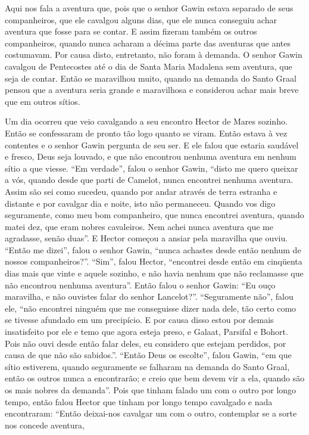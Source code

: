 Aqui nos fala a aventura que,  pois que o senhor Gawin estava separado
de seus companheiros, que ele cavalgou alguns dias, que ele nunca conseguiu
achar aventura que  fosse para se contar. E assim fizeram também os outros
companheiros, quando nunca acharam a décima parte das aventuras que antes
costumavam. Por causa disto, entretanto, não foram à demanda. O senhor Gawin
cavalgou de Pentecostes até o dia de Santa Maria Madalena sem aventura, que
seja de contar. Então se maravilhou muito, quando na demanda do Santo Graal
pensou que a aventura seria grande e maravilhosa e considerou achar mais breve
que em outros sítios.

Um dia ocorreu que veio cavalgando a seu encontro Hector de Mares sozinho. Então
se confessaram de pronto tão logo quanto se viram. Então estava à vez contentes
e o senhor Gawin pergunta de seu ser. E ele falou que estaria saudável e
fresco, Deus seja louvado, e que não encontrou nenhuma aventura em nenhum sítio
a que viesse. “Em verdade”, falou o senhor Gawin, “disto me quero queixar a
vós, quando desde que parti de Camelot, nunca encontrei nenhuma aventura. Assim
são sei como sucedeu, quando por andar através de terra estranha e distante e
por cavalgar dia e noite, isto não permaneceu. Quando vos digo seguramente,
como meu bom companheiro, que nunca encontrei aventura, quando matei dez, que
eram nobres cavaleiros. Nem achei nunca aventura que me agradasse, senão duas”.
E Hector começou a ansiar pela maravilha que ouviu. “Então me dizei”, falou o
senhor Gawin, “nunca achastes desde então nenhum de nossos companheiros?”.
“Sim”, falou Hector, “encontrei desde então em cinqüenta dias mais que vinte e
aquele sozinho, e não havia nenhum que não reclamasse que não encontrou nenhuma
aventura”. Então falou o senhor Gawin: “Eu ouço maravilha, e não ouvistes falar
do senhor Lancelot?”. “Seguramente não”, falou ele, “não encontrei ninguém que
me conseguisse dizer nada dele, tão certo como se tivesse afundado em um
precipício. E por causa disso estou por demais insatisfeito por ele e temo que
agora esteja preso, e Galaat, Parsifal e Bohort. Pois não ouvi desde então
falar deles, eu considero que estejam perdidos, por causa de que não são
sabidos.”. “Então Deus os escolte”, falou Gawin, “em que sítio estiverem,
quando seguramente se falharam na demanda do Santo Graal, então os outros nunca
a encontrarão; e creio que bem devem vir a ela, quando são os mais nobres da
demanda”. Pois que tinham falado um com o outro por longo tempo, então falou
Hector que tinham por longo tempo cavalgado e nada encontraram: “Então
deixai-nos cavalgar um com o outro, contemplar se a sorte nos concede aventura,
